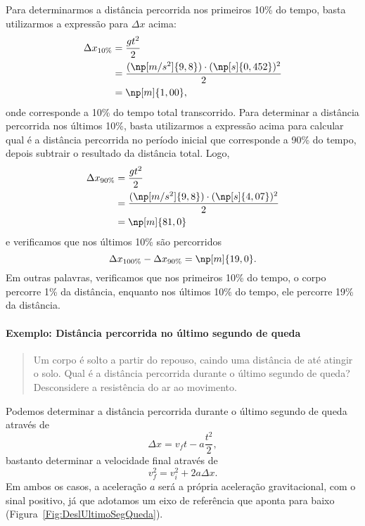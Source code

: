 Para determinarmos a distância percorrida nos primeiros 10\% do tempo, basta utilizarmos a expressão para $\Delta x$ acima:
\begin{align}
	\Delta x_{10\%} &= \frac{gt^2}{2} \\
	&= \frac{(\np[m/s^2]{9,8}) \cdot (\np[s]{0,452})^2}{2} \\
	&= \np[m]{1,00},
\end{align}
%
onde  corresponde a 10\% do tempo total transcorrido. Para determinar a distância percorrida nos últimos 10\%, basta utilizarmos a expressão acima para calcular qual é a distância percorrida no período inicial que corresponde a 90\% do tempo, depois subtrair o resultado da distância total. Logo,
\begin{align}
	\Delta x_{90\%} &= \frac{gt^2}{2} \\
	&= \frac{(\np[m/s^2]{9,8}) \cdot (\np[s]{4,07})^2}{2} \\
	&= \np[m]{81,0}
\end{align}
%
e verificamos que nos últimos 10\% são percorridos
\begin{equation}
	\Delta x_{100\%} - \Delta x_{90\%} = \np[m]{19,0}.
\end{equation}
%
Em outras palavras, verificamos que nos primeiros 10\% do tempo, o corpo percorre 1\% da distância, enquanto nos últimos 10\% do tempo, ele percorre 19\% da distância.

\paragraph{Exemplo: Distância percorrida no último segundo de queda}

\begin{quote}
    Um corpo é solto a partir do repouso, caindo uma distância de  até atingir o solo. Qual é a distância percorrida durante o último segundo de queda? Desconsidere a resistência do ar ao movimento.
\end{quote}

Podemos determinar a distância percorrida durante o último segundo de queda através de
\begin{equation}
    \Delta x = v_f t - a\frac{t^2}{2},
\end{equation}
%
bastanto determinar a velocidade final através de
\begin{equation}
    v_f^2 = v_i^2 + 2 a \Delta x.
\end{equation}
%
Em ambos os casos, a aceleração $a$ será a própria aceleração gravitacional, com o sinal positivo, já que adotamos um eixo de referência que aponta para baixo (Figura~\ref{Fig:DeslUltimoSegQueda}).

